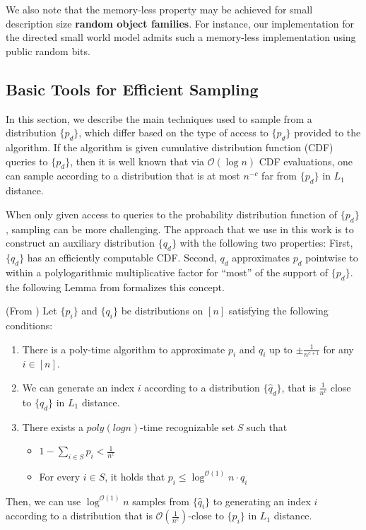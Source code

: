 We also note that the memory-less property may be achieved for small description size \textbf{random object families}.
For instance, our implementation for the directed small world model admits such a memory-less implementation using public random bits.










\subsection{Basic Tools for Efficient Sampling}
\label{sec:basic_tools_for_efficient_sampling}
In this section, we describe the main techniques used to sample from a distribution $\{ p_d\}$,
which differ based on the type of access to $\{p_d\}$ provided to the algorithm.
If the algorithm is given cumulative distribution function (CDF) queries to $\{p_d\}$,
then it is well known that via $\mathcal O(\log n)$ CDF evaluations, one can sample according
to a distribution that is at most $n^{-c}$ far from $\{p_d\}$ in $L_1$ distance.

When only given access to queries to the probability distribution function of $\{p_d\}$, sampling can be more challenging.
The approach that we use in this work is to construct an auxiliary distribution $\{q_d\}$ with the following two properties:
First, $\{ q_d\}$ has an efficiently computable CDF.
Second, $q_d$ approximates $p_d$ pointwise to within a polylogarithmic multiplicative factor for ``most'' of the support of $\{ p_d\}$.
the following Lemma from \cite{huge} formalizes this concept. %
\begin{lemma}
\label{lem:rejection_sampling} (From \cite{huge})
Let $\{p_i\}$ and $\{q_i\}$ be distributions on $[n]$ satisfying the following conditions:
\begin{enumerate}
\item There is a poly-time algorithm to approximate $p_i$ and $q_i$ up to $\pm \frac{1}{n^{c+1}}$ for any $i\in [n]$.
    \item We can generate an index $i$ according to a distribution $\{\hat q_d\}$, that is $ \frac{1}{n^c}$ close to $\{q_d\}$ in $L_1$ distance.
    \item There exists a $poly(log n)$-time recognizable set $S$ such that
    \begin{itemize}
        \item $1-\sum\limits_{i\in S} p_i < \frac 1{n^c}$
        \item For every $i\in S$, it holds that $p_i\le \log^{\mathcal{O}(1)} n\cdot q_i$
    \end{itemize}
\end{enumerate}
Then, we can use $\log^{\mathcal O(1)}n$ samples from $\{\hat q_i\}$ to generating an index $i$
according to a distribution that is $ \mathcal O\left(\frac{1}{n^c}\right)$-close to $\{p_i\}$ in $L_1$ distance.
\end{lemma}
